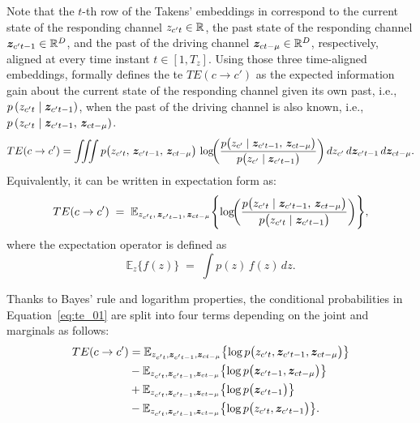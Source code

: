 Note that the $t$-th row of the Takens' embeddings in  correspond to the current state of the responding channel $z_{c't}\in\mathbb{R}$, the past state of the responding channel ${\bm{z}}_{c't-1}\in\mathbb{R}^D$, and the past of the driving channel ${\bm{z}}_{ct-\mu}\in\mathbb{R}^D$, respectively, aligned at every time instant $t\in[1,T_z]$. Using those three time-aligned embeddings,  formally defines the \gls{te}  $TE(c \to c')$ as the expected information gain about the current state of the responding channel given its own past, i.e., $p\left(z_{c't} \mid {\bm{z}}_{c't-1}\right)$, when the past of the driving channel is also known, i.e.,  $p\left(z_{c't} \mid {\bm{z}}_{c't-1},\,{\bm{z}}_{ct-\mu}\right)$. 
\begin{equation}
    TE(c \to c') = 
    \iiint 
    p\bigl(z_{c't},\,{\bm{z}}_{c't-1},\,{\bm{z}}_{ct-\mu}\bigr)\, 
    \log\!\biggl(
      \frac{ 
        p\bigl({z}_{c'} \mid {\bm{z}}_{c't-1},\,{\bm{z}}_{ct-\mu}\bigr)
      }{
        p\bigl({z}_{c'} \mid {\bm{z}}_{c't-1}\bigr)
      }
    \biggr)
    \,d{z}_{c'}\,d{\bm{z}}_{c't-1}\,d{\bm{z}}_{ct-\mu}.
\label{eq:te_01}
\end{equation}
Equivalently, it can be written in expectation form as:
\begin{equation}
    TE(c \to c') \;=\; 
\mathbb{E}_{z_{c't},\,{\bm{z}}_{c't-1},\,{\bm{z}}_{ct-\mu}}
\Biggl\{
  \log\!\biggl(
    \frac{ 
      p\bigl(z_{c't} \mid {\bm{z}}_{c't-1},\,{\bm{z}}_{ct-\mu}\bigr)
    }{
      p\bigl(z_{c't} \mid {\bm{z}}_{c't-1}\bigr)
    }
  \biggr)
\Biggr\},
\end{equation}
where the expectation operator is defined as 
\begin{equation}
    \mathbb{E}_{z}\{f(z)\} \;=\; \int p(z)\,f(z)\,dz.
\end{equation}

Thanks to Bayes’ rule and logarithm properties, the conditional probabilities in Equation~\eqref{eq:te_01} are split into four terms depending on the joint and marginals as follows:
\begin{align}
 TE(c \to c') &= \mathbb{E}_{z_{c't},{\bm{z}}_{c't-1},{\bm{z}}_{ct-\mu}}
      \bigl\{\log p\bigl(z_{c't},{\bm{z}}_{c't-1},{\bm{z}}_{ct-\mu}\bigr)\bigr\} \label{eq:TE_expansion1}\\
      &-\mathbb{E}_{z_{c't},{\bm{z}}_{c't-1},{\bm{z}}_{ct-\mu}}
      \bigl\{\log p\bigl({\bm{z}}_{c't-1},{\bm{z}}_{ct-\mu}\bigr)\bigr\}\nonumber\\
      &+\mathbb{E}_{z_{c't},{\bm{z}}_{c't-1},{\bm{z}}_{ct-\mu}}
      \bigl\{\log p\bigl({\bm{z}}_{c't-1}\bigr)\bigr\}\nonumber\\
      &-\mathbb{E}_{z_{c't},{\bm{z}}_{c't-1},{\bm{z}}_{ct-\mu}}
      \bigl\{\log p\bigl(z_{c't},{\bm{z}}_{c't-1}\bigr)\bigr\}.\nonumber
\end{align}

